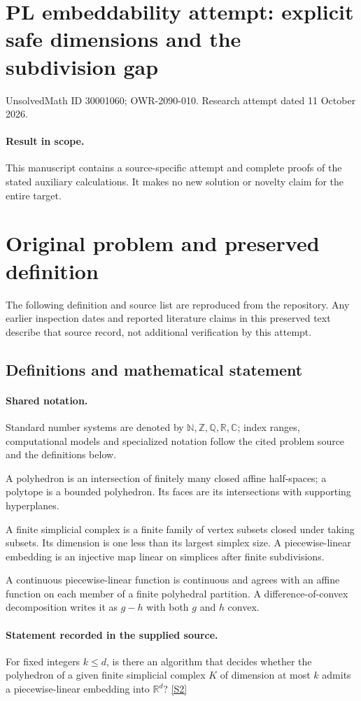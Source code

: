 \documentclass[11pt]{article}
\begin{document}
\section*{PL embeddability attempt: explicit safe dimensions and the subdivision gap}
\noindent UnsolvedMath ID 30001060; OWR-2090-010. Research attempt dated 11 October 2026.
\paragraph{Result in scope.}This manuscript contains a source-specific attempt and complete proofs of the stated auxiliary calculations. It makes no new solution or novelty claim for the entire target.
\section{Original problem and preserved definition}
The following definition and source list are reproduced from the repository. Any earlier inspection dates and reported literature claims in this preserved text describe that source record, not additional verification by this attempt.
\subsection{Definitions and mathematical statement}

\paragraph{Shared notation.}Standard number systems are denoted by $\mathbb N,\mathbb Z,\mathbb Q,\mathbb R,\mathbb C$; index ranges, computational models and specialized notation follow the cited problem source and the definitions below.


A polyhedron is an intersection of finitely many closed affine half-spaces; a polytope is a bounded polyhedron. Its faces are its intersections with supporting hyperplanes.

A finite simplicial complex is a finite family of vertex subsets closed under taking subsets. Its dimension is one less than its largest simplex size. A piecewise-linear embedding is an injective map linear on simplices after finite subdivisions.

A continuous piecewise-linear function is continuous and agrees with an affine function on each member of a finite polyhedral partition. A difference-of-convex decomposition writes it as $g-h$ with both $g$ and $h$ convex.
\paragraph{Statement recorded in the supplied source.}
For fixed integers $k\leq d$, is there an algorithm that decides whether the polyhedron of a given finite simplicial complex $K$ of dimension at most $k$ admits a piecewise-linear embedding into $\mathbb R^d$? \href{https://doi.org/10.4171/owr/2008/44}{[S2]}
\end{document}
